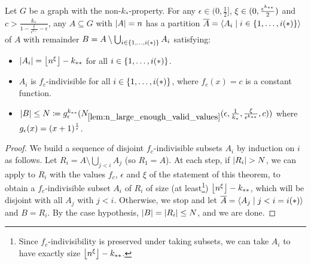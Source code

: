         \begin{theorem} \label{thm:equitative_partition_high_regularity_parts_grow_with_n}
            Let $G$ be a graph with the non-$k_*$-property.
            For any $\epsilon \in (0, \frac{1}{2}]$, $\xi \in ( 0, \frac{\epsilon^{k_{**}}}{2} )$ and
            $c > \frac{k_*}{1-\frac{\xi}{\epsilon^{k_{**}}} - \epsilon}$, any $A \subseteq G$ with $| A | = n$
            has a partition $\overline{A} = \left< A_i \mid i \in \{ 1, \dots, i(*) \} \right>$ of $A$ with remainder
            $B = A \setminus \bigcup_{i \in \{ 1, \dots, i(*) \}} A_i$ satisfying:
            \begin{itemize}
                \item $|A_i| = \left\lfloor n^\xi \right\rfloor - k_{**}$ for all $i \in \{ 1, \dots, i(*) \}$.
                \item $A_i$ is $f_c$-indivisible for all $i \in \{ 1, \dots, i(*) \}$, where $f_c(x) = c$ is a constant function.
                \item $|B| \leq N \coloneqq g_\epsilon^{k_{**}}( N_{\ref{lem:n_large_enough_valid_values}}( \epsilon, \frac{1}{k_*}, \frac{\xi}{\epsilon^{k_{**}}}, c ) )$
                    where $g_\epsilon(x) = ( x+1 )^{\frac{1}{\epsilon}}$.
            \end{itemize}
            \begin{proof}
                We build a sequence of disjoint $f_c$-indivisible subsets $A_i$ by induction on $i$ as follows.
                Let $R_i = A \setminus \bigcup_{j<i} A_j$ (so $R_1 = A$).
                At each step, if $| R_i | > N$, we can apply  to $R_i$
                with the values $f_c$, $\epsilon$ and $\xi$ of the statement of this theorem,
                to obtain a $f_c$-indivisible subset $A_i$ of $R_i$ of size (at least\footnote{
                    Since $f_c$-indivisibility is preserved under taking subsets, we can take $A_i$ to have exactly size $\left\lfloor n^\xi \right\rfloor - k_{**}$.
                }) $\left\lfloor n^\xi \right\rfloor - k_{**}$, which will be disjoint with all $A_j$ with $j < i$.
                Otherwise, we stop and let $\overline{A} = \left< A_j \mid j < i = i(*) \right>$ and $B = R_i$.
                By the case hypothesis, $| B | = | R_i | \leq N$, and we are done.
            \end{proof}
        \end{theorem}

